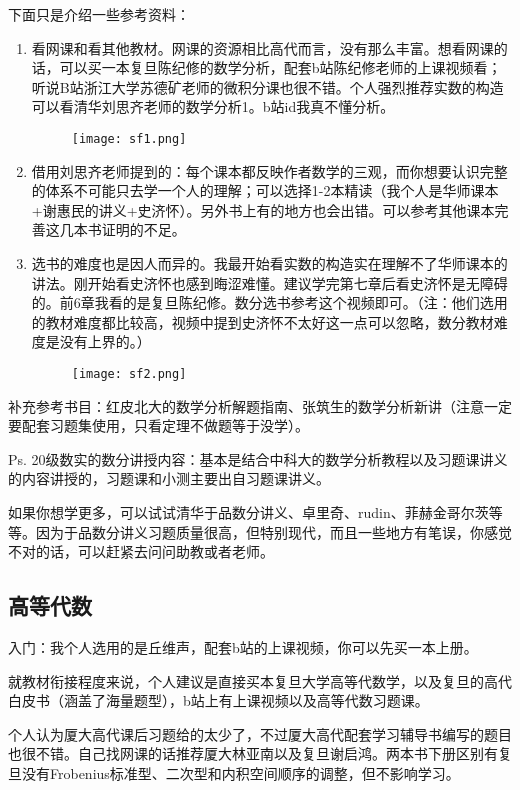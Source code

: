 \documentclass{my_paper}
\begin{document}
下面只是介绍一些参考资料：
\begin{enumerate}
    \item 	看网课和看其他教材。网课的资源相比高代而言，没有那么丰富。想看网课的话，可以买一本复旦陈纪修的数学分析，配套b站陈纪修老师的上课视频看；听说B站浙江大学苏德矿老师的微积分课也很不错。个人强烈推荐实数的构造可以看清华刘思齐老师的数学分析1。b站id我真不懂分析。
    \begin{figure}[htbp]
	\centering
	\texttt{[image: sf1.png]}
\end{figure} 
    \item 	借用刘思齐老师提到的：每个课本都反映作者数学的三观，而你想要认识完整的体系不可能只去学一个人的理解；可以选择1-2本精读（我个人是华师课本+谢惠民的讲义+史济怀）。另外书上有的地方也会出错。可以参考其他课本完善这几本书证明的不足。
    \item 	选书的难度也是因人而异的。我最开始看实数的构造实在理解不了华师课本的讲法。刚开始看史济怀也感到晦涩难懂。建议学完第七章后看史济怀是无障碍的。前6章我看的是复旦陈纪修。数分选书参考这个视频即可。（注：他们选用的教材难度都比较高，视频中提到史济怀不太好这一点可以忽略，数分教材难度是没有上界的。）
        \begin{figure}[H]
	\centering
	\texttt{[image: sf2.png]}
\end{figure} 
\end{enumerate}

补充参考书目：红皮北大的数学分析解题指南、张筑生的数学分析新讲（注意一定要配套习题集使用，只看定理不做题等于没学）。

Ps. 20级数实的数分讲授内容：基本是结合中科大的数学分析教程以及习题课讲义的内容讲授的，习题课和小测主要出自习题课讲义。

如果你想学更多，可以试试清华于品数分讲义、卓里奇、rudin、菲赫金哥尔茨等等。因为于品数分讲义习题质量很高，但特别现代，而且一些地方有笔误，你感觉不对的话，可以赶紧去问问助教或者老师。

\subsection{高等代数}
入门：我个人选用的是丘维声，配套b站的上课视频，你可以先买一本上册。

就教材衔接程度来说，个人建议是直接买本复旦大学高等代数学，以及复旦的高代白皮书（涵盖了海量题型），b站上有上课视频以及高等代数习题课。

个人认为厦大高代课后习题给的太少了，不过厦大高代配套学习辅导书编写的题目也很不错。自己找网课的话推荐厦大林亚南以及复旦谢启鸿。两本书下册区别有复旦没有Frobenius标准型、二次型和内积空间顺序的调整，但不影响学习。
\end{document}
